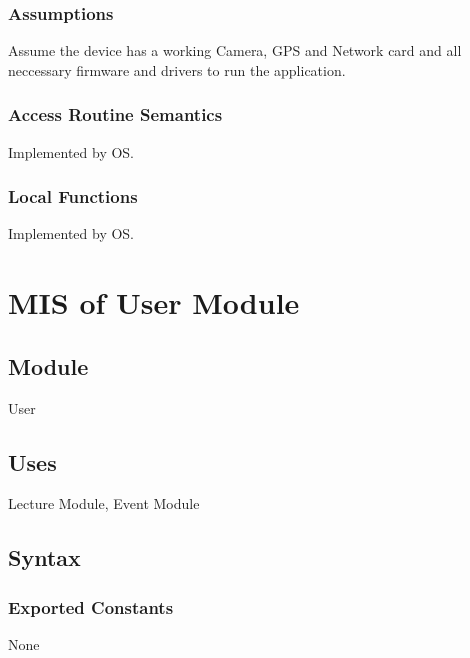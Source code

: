 \documentclass[12pt, titlepage]{article}
\begin{document}
\subsubsection{Assumptions}

Assume the device has a working Camera, GPS and Network card and all neccessary firmware and drivers to run the application.

\subsubsection{Access Routine Semantics}

Implemented by OS.

\subsubsection{Local Functions}

Implemented by OS.

\section{MIS of User Module} \label{mUser}

\subsection{Module}

User

\subsection{Uses}

Lecture Module, Event Module

\subsection{Syntax}

\subsubsection{Exported Constants}
None
\end{document}
